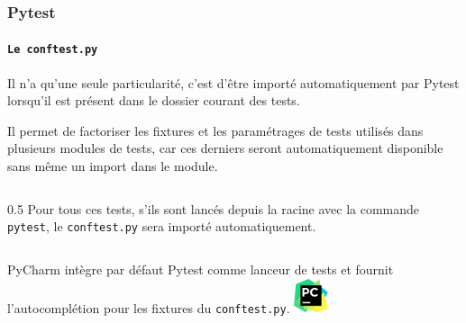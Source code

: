 \documentclass{beamer}
\begin{document}
    \begin{frame}[fragile]
        \frametitle{Pytest}
        \framesubtitle{\lstinline{Le conftest.py}}
        \transdissolve
        Il n'a qu'une seule particularité, c'est d'être importé automatiquement par Pytest lorsqu'il est présent dans le dossier courant des tests.

        Il permet de factoriser les fixtures et les paramétrages de tests utilisés dans plusieurs modules de tests, car ces derniers seront automatiquement disponible sans même un import dans le module.
        \begin{columns}
            \column
            {0.5\textwidth}
            Pour tous ces tests, s'ils sont lancés depuis la racine avec la commande \lstinline{pytest}, le \lstinline{conftest.py} sera importé automatiquement.
        \end{columns}
        \bigbreak
        \begin{columns}
            PyCharm intègre par défaut Pytest comme lanceur de tests et fournit l'autocomplétion pour les fixtures du \lstinline{conftest.py}.
            \centering
            \includegraphics[width=1cm]{image/logo-pycharm.png}
        \end{columns}
    \end{frame}
\end{document}
